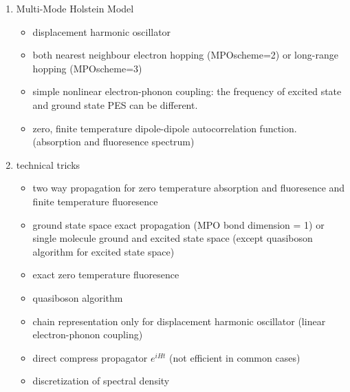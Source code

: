 \documentclass[a4paper,11pt]{ctexart}
\begin{document}
\begin{enumerate}
\item Multi-Mode Holstein Model
    \begin{itemize}
        \item displacement harmonic oscillator
        \item both nearest neighbour electron hopping (MPOscheme=2) or long-range hopping
            (MPOscheme=3)
        \item simple nonlinear electron-phonon coupling: the frequency of excited state and ground state PES can be different.
        \item zero, finite temperature dipole-dipole autocorrelation function.
            (absorption and fluoresence spectrum)
    \end{itemize}

\item technical tricks
    \begin{itemize}
        \item two way propagation for zero temperature absorption and
            fluoresence and finite temperature fluoresence
        \item ground state space exact propagation (MPO bond dimension = 1) or
            single molecule ground and excited state space (except quasiboson
            algorithm for excited state space)
        \item exact zero temperature fluoresence
        \item quasiboson algorithm
        \item chain representation only for displacement harmonic oscillator
            (linear electron-phonon coupling)
        \item direct compress propagator $e^{iHt}$ (not efficient in common cases)
        \item discretization of spectral density 
    \end{itemize}

\end{enumerate}
\end{document}
